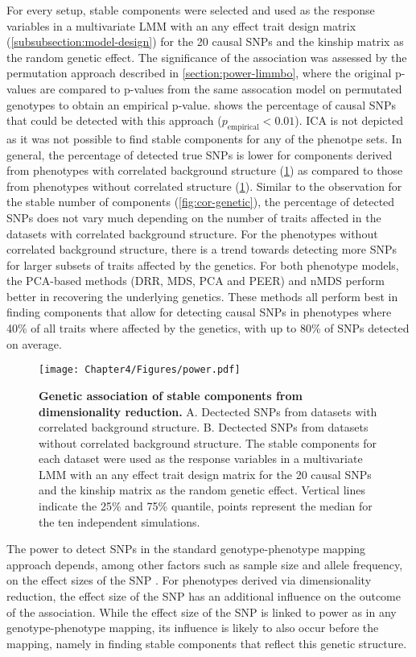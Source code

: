 For every setup, stable components were selected and used as the response variables in a multivariate LMM with an any effect trait design matrix (\cref{subsubsection:model-design}) for the \num{20} causal SNPs and the kinship matrix as the random genetic effect. The significance of the association was assessed by the permutation approach described in \cref{section:power-limmbo}, where the original p-values are compared to p-values from the same assocation model on permutated genotypes to obtain an empirical p-value.  shows the percentage of causal SNPs that could be detected with this approach (\(p_\text{empirical} < 0.01\)). ICA is not depicted as it was not possible to find stable components for any of the phenotpe sets.  In general, the percentage of detected true SNPs is lower for components derived from phenotypes with correlated background structure (\cref{fig:power-dimRed}) as compared to those from phenotypes without correlated structure (\cref{fig:power-dimRed}). Similar to the observation for the stable number of components (\cref{fig:cor-genetic}), the percentage of detected SNPs does not vary much depending on the number of traits affected in the datasets with correlated background structure. For the phenotypes without correlated background structure, there is a trend towards detecting more SNPs for larger subsets of traits affected by the genetics. For both phenotype models, the PCA-based methods (DRR, MDS, PCA and PEER) and nMDS perform better in recovering the underlying genetics. These methods all perform best in finding components that allow for detecting causal SNPs in phenotypes where \num{40}\% of all traits where affected by the genetics, with up to \num{80}\% of SNPs detected on average. 
%
\begin{figure}[hbtp]
	\centering
	\texttt{[image: Chapter4/Figures/power.pdf]}
	\caption[\textbf{Genetic association of stable components from dimensionality reduction.}]{\textbf{Genetic association of stable components from dimensionality reduction. } A. Dectected SNPs from datasets with correlated background structure. B.  Dectected SNPs from datasets without correlated background structure. The stable components for each dataset were used as the response variables in a multivariate LMM with an any effect trait design matrix for the \num{20} causal SNPs and the kinship matrix as the random genetic effect. Vertical lines indicate the \num{25}\% and \num{75}\% quantile, points represent the median for the ten independent simulations. } 
	 	\label{fig:power-dimRed}
\end{figure}
%
The power to detect SNPs in the standard genotype-phenotype mapping approach depends, among other factors such as sample size and allele frequency, on the effect sizes of the SNP \citep{Cohen1992,Halsey2015,Astle2016}.  For phenotypes derived via dimensionality reduction, the effect size of the SNP has an additional influence on the outcome of the association.  While the effect size of the SNP is linked to power as in any genotype-phenotype mapping, its influence is likely to also occur before the mapping, namely in finding stable components that reflect this genetic structure. 

